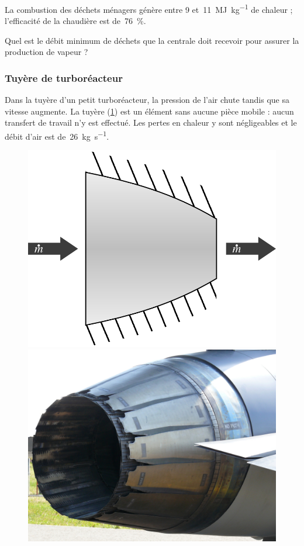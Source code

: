 	La combustion des déchets ménagers génère entre \num{9} et~\SI{11}{\mega\joule\per\kilogram} de chaleur ; l’efficacité de la chaudière est de~\SI{76}{\percent}.
	
	Quel est le débit minimum de déchets que la centrale doit recevoir pour assurer la production de vapeur ?
	

\subsubsection{Tuyère de turboréacteur}
\label{exo_tuyere_turboreacteur}

	Dans la tuyère d’un petit turboréacteur, la pression de l’air chute tandis que sa vitesse augmente. La tuyère (\cref{fig_nozzle}) est un élément sans aucune pièce mobile : aucun transfert de travail n’y est effectué. Les pertes en chaleur y sont négligeables et le débit d’air est de~\SI{26}{\kilogram\per\second}. 

	\begin{figure}
		\begin{center}
			\includegraphics[height=0.35\textwidth, max height=0.5\columnwidth]{images/symbole_tuyere.png}
			\hspace{0.3cm}
			\includegraphics[height=0.35\textwidth, max height=0.5\columnwidth]{images/nozzle_f100.jpg}
		\end{center}
		\label{fig_nozzle}
	\end{figure}

